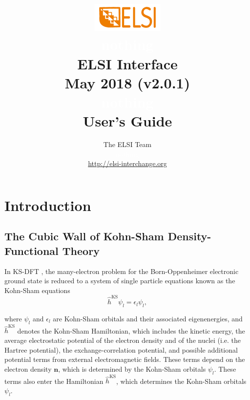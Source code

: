 \documentclass{report}
\begin{document}
\title{\includegraphics[scale=0.07]{elsi_logo.png}\\ \textcolor{white}{nothing}\\ \textbf{ELSI Interface\\ May 2018 (v2.0.1)\\ \textcolor{white}{nothing} \\ User's Guide}}
\author{The ELSI Team\\ \textcolor{white}{nothing}\\ \url{http://elsi-interchange.org}}
\maketitle

\tableofcontents

\chapter{Introduction}
\section{The Cubic Wall of Kohn-Sham Density-Functional Theory}
\label{sec:ksdft}
In KS-DFT \cite{ks_kohn_1965}, the many-electron problem for the Born-Oppenheimer electronic ground state is reduced to a system of single particle equations known as the Kohn-Sham equations\\
\begin{equation}
\label{eq:ks}
\hat{h}^\text{KS} \psi_l = \epsilon_l \psi_l ,
\end{equation}

\noindent where $\psi_l$ and $\epsilon_l$ are Kohn-Sham orbitals and their associated eigenenergies, and $\hat{h}^\text{KS}$ denotes the Kohn-Sham Hamiltonian, which includes the kinetic energy, the average electrostatic potential of the electron density and of the nuclei (i.e. the Hartree potential), the exchange-correlation potential, and possible additional potential terms from external electromagnetic fields.  These terms depend on the electron density $\boldsymbol{n}$, which is determined by the Kohn-Sham orbitals $\psi_l$.  These terms also enter the Hamiltonian $\hat{h}^\text{KS}$, which determines the Kohn-Sham orbitals $\psi_l$.\\
\end{document}
